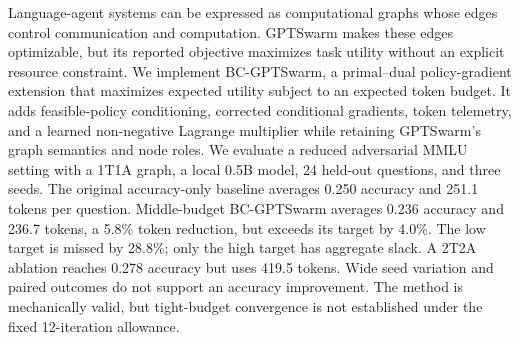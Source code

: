 Language-agent systems can be expressed as computational graphs whose edges control communication and computation. GPTSwarm makes these edges optimizable, but its reported objective maximizes task utility without an explicit resource constraint. We implement BC-GPTSwarm, a primal--dual policy-gradient extension that maximizes expected utility subject to an expected token budget. It adds feasible-policy conditioning, corrected conditional gradients, token telemetry, and a learned non-negative Lagrange multiplier while retaining GPTSwarm's graph semantics and node roles. We evaluate a reduced adversarial MMLU setting with a 1T1A graph, a local 0.5B model, 24 held-out questions, and three seeds. The original accuracy-only baseline averages 0.250 accuracy and 251.1 tokens per question. Middle-budget BC-GPTSwarm averages 0.236 accuracy and 236.7 tokens, a 5.8\% token reduction, but exceeds its target by 4.0\%. The low target is missed by 28.8\%; only the high target has aggregate slack. A 2T2A ablation reaches 0.278 accuracy but uses 419.5 tokens. Wide seed variation and paired outcomes do not support an accuracy improvement. The method is mechanically valid, but tight-budget convergence is not established under the fixed 12-iteration allowance.
